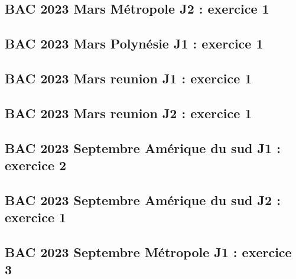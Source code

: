 \documentclass[lang=fr,edition=teacher,layout=sheet]{mxbook}
\begin{document}
\begingroup\endgroup
\par\bigskip
{}\subsection*{BAC 2023 Mars Métropole J2 : exercice 1}
\begingroup\endgroup
\par\bigskip
{}\subsection*{BAC 2023 Mars Polynésie J1 : exercice 1}
\begingroup\endgroup
\par\bigskip
{}\subsection*{BAC 2023 Mars reunion J1 : exercice 1}
\begingroup\endgroup
\par\bigskip
{}\subsection*{BAC 2023 Mars reunion J2 : exercice 1}
\begingroup\endgroup
\par\bigskip
{}\subsection*{BAC 2023 Septembre Amérique du sud J1 : exercice 2}
\begingroup\endgroup
\par\bigskip
{}\subsection*{BAC 2023 Septembre Amérique du sud J2 : exercice 1}
\begingroup\endgroup
\par\bigskip
{}\subsection*{BAC 2023 Septembre Métropole J1 : exercice 3}
\end{document}
